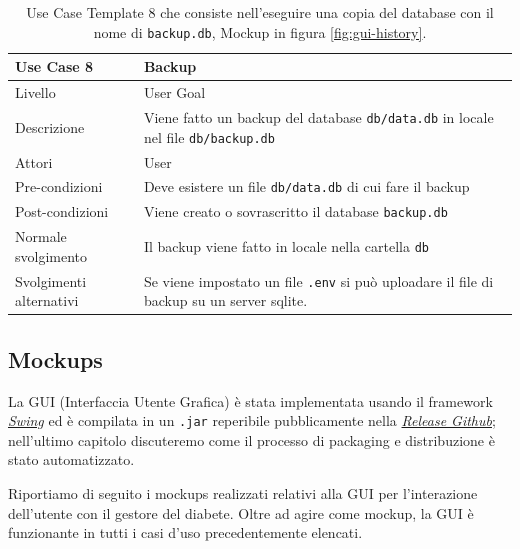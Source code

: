 \documentclass[twocolumn]{article}
\begin{document}
\begin{table}[!htbp]
    \centering
    \captionsetup{justification=centering}
    \begin{tabular}{|p{4.5cm}|p{9.5cm}|}
        \hline
        Use Case 8 & Backup\\
        \hline
        Livello & User Goal \\
        \hline
        Descrizione & Viene fatto un backup del database \texttt{db/data.db} in locale nel file \texttt{db/backup.db}\\
        \hline
        Attori & User \\
        \hline
        Pre-condizioni & Deve esistere un file \texttt{db/data.db} di cui fare il backup\\
        \hline
        Post-condizioni & Viene creato o sovrascritto il database \texttt{backup.db}\\
        \hline
        Normale svolgimento & Il backup viene fatto in locale nella cartella \texttt{db}\\
        \hline
        Svolgimenti alternativi & Se viene impostato un file \texttt{.env} si può uploadare il file di backup su un server sqlite.\\
        \hline
    \end{tabular}
    \caption{Use Case Template 8 che consiste nell'eseguire una copia del database con il nome di \texttt{backup.db}, Mockup in figura \ref{fig:gui-history}.}
    \label{tab:uc8}
\end{table}

\clearpage

\subsection{Mockups}

La GUI (Interfaccia Utente Grafica) è stata implementata usando il framework \href{https://it.wikipedia.org/wiki/Swing_(Java)}{\textit{Swing}} ed è compilata in un \texttt{.jar} reperibile pubblicamente nella \href{https://github.com/federicomarra/swe-diab/releases}{\textit{Release Github}}; nell'ultimo capitolo discuteremo come il processo di packaging e distribuzione è stato automatizzato.

Riportiamo di seguito i mockups realizzati relativi alla GUI per l’interazione dell'utente con il gestore del diabete. Oltre ad agire come mockup, la GUI è funzionante in tutti i casi d'uso precedentemente elencati.
\end{document}

